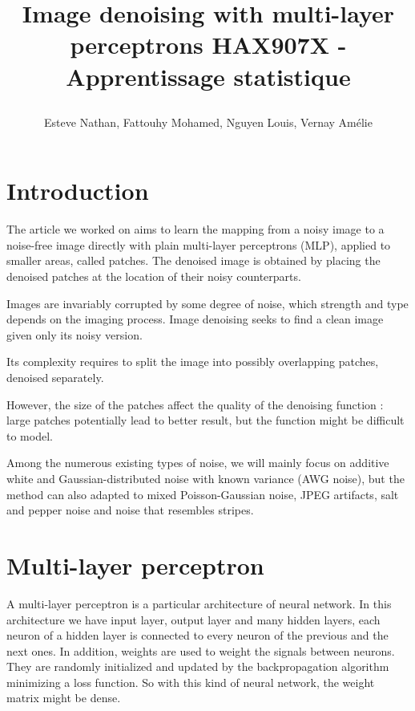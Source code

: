 \documentclass[10pt,a4paper]{article}
\author{Esteve Nathan, Fattouhy Mohamed, Nguyen Louis, Vernay Amélie}
\title{%
    \begin{minipage}\linewidth
        \centering
        Image denoising with multi-layer perceptrons
        \vskip3pt
        \large 
        HAX907X - Apprentissage statistique
    \end{minipage}
}
\newcommand{\svs}{\vspace{9pt}}
\begin{document}
\maketitle
\section{Introduction}

The article we worked on \cite{denoise} aims to learn the mapping from a noisy image to a noise-free image directly with plain multi-layer perceptrons (MLP), applied to smaller areas, called patches. The denoised image is obtained by placing the denoised patches at the location of their noisy counterparts.

\svs

Images are invariably corrupted by some degree of noise, which strength and type depends on the imaging process. Image denoising seeks to find a clean image given only its noisy version.

\svs

Its complexity requires to split the image into possibly overlapping patches, denoised separately.

\svs

However, the size of the patches affect the quality of the denoising function : large patches potentially lead to better result, but the function might be difficult to model.

\svs

Among the numerous existing types of noise, we will mainly focus on additive white and Gaussian-distributed noise with known variance (AWG noise), but the method can also adapted to mixed Poisson-Gaussian noise, JPEG artifacts, salt and pepper noise and noise that resembles stripes.


\section{Multi-layer perceptron}

A multi-layer perceptron is a particular architecture of neural network. In this architecture we have input layer, output layer and many hidden layers, each neuron of a hidden layer is connected to every neuron of the previous and the next ones.  In addition, weights are used to weight the signals between neurons. They are randomly initialized and updated by the backpropagation algorithm minimizing a loss function. So with this kind of neural network, the weight matrix might be dense.
\end{document}

